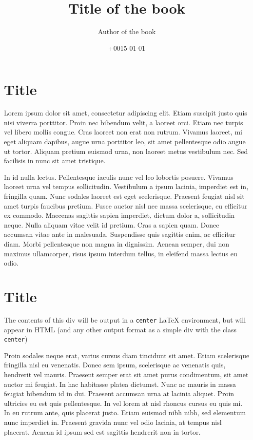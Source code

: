 \documentclass[
  a5paper,
  smalldemyvopaper,10pt,twoside,onecolumn,openright,extrafontsizes,hidelinks]{memoir}
\title{Title of the book}
\author{Author of the book}
\date{+0015-01-01}
\renewcommand*\contentsname{Table of contents}
\newcommand\contentsname{Table of contents}
\begin{document}
\frontmatter
\maketitle

\renewcommand*\contentsname{Contents}
{
\setcounter{tocdepth}{0}
\tableofcontents
}

\mainmatter
{}

\chapter{Title}\label{title}

Lorem ipsum dolor sit amet, consectetur adipiscing elit. Etiam suscipit
justo quis nisi viverra porttitor. Proin nec bibendum velit, a laoreet
orci. Etiam nec turpis vel libero mollis congue. Cras laoreet non erat
non rutrum. Vivamus laoreet, mi eget aliquam dapibus, augue urna
porttitor leo, sit amet pellentesque odio augue ut tortor. Aliquam
pretium euismod urna, non laoreet metus vestibulum nec. Sed facilisis in
nunc sit amet tristique.

In id nulla lectus. Pellentesque iaculis nunc vel leo lobortis posuere.
Vivamus laoreet urna vel tempus sollicitudin. Vestibulum a ipsum
lacinia, imperdiet est in, fringilla quam. Nunc sodales laoreet est eget
scelerisque. Praesent feugiat nisl sit amet turpis faucibus pretium.
Fusce auctor nisl nec massa scelerisque, eu efficitur ex commodo.
Maecenas sagittis sapien imperdiet, dictum dolor a, sollicitudin neque.
Nulla aliquam vitae velit id pretium. Cras a sapien quam. Donec accumsan
vitae ante in malesuada. Suspendisse quis sagittis enim, ac efficitur
diam. Morbi pellentesque non magna in dignissim. Aenean semper, dui non
maximus ullamcorper, risus ipsum interdum tellus, in eleifend massa
lectus eu odio.


\chapter{Title}\label{title-1}

\begin{center}
The contents of this div will be output in a \texttt{center} LaTeX
environment, but will appear in HTML (and any other output format as a
simple div with the class \texttt{center})

\end{center}

Proin sodales neque erat, varius cursus diam tincidunt sit amet. Etiam
scelerisque fringilla nisl eu venenatis. Donec sem ipsum, scelerisque ac
venenatis quis, hendrerit vel mauris. Praesent semper erat sit amet
purus condimentum, sit amet auctor mi feugiat. In hac habitasse platea
dictumst. Nunc ac mauris in massa feugiat bibendum id in dui. Praesent
accumsan urna at lacinia aliquet. Proin ultricies eu est quis
pellentesque. In vel lorem at nisl rhoncus cursus eu quis mi. In eu
rutrum ante, quis placerat justo. Etiam euismod nibh nibh, sed elementum
nunc imperdiet in. Praesent gravida nunc vel odio lacinia, at tempus
nisl placerat. Aenean id ipsum sed est sagittis hendrerit non in tortor.
\end{document}
